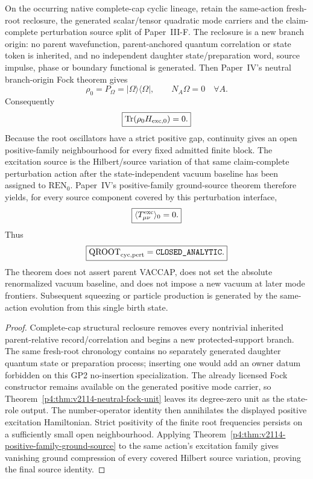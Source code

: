 \documentclass[12pt,a4paper]{article}
\begin{document}
\begin{theorem}
\label{p8:thm:v2114-fresh-root-neutral-qroot}
On the occurring native complete-cap cyclic lineage, retain the same-action
fresh-root reclosure, the generated scalar/tensor quadratic mode carriers and
the claim-complete perturbation source split of Paper~III-F.  The reclosure is
a new branch origin: no parent wavefunction, parent-anchored quantum
correlation or state token is inherited, and no independent daughter
state/preparation word, source impulse, phase or boundary functional is
generated.  Then Paper~IV's neutral branch-origin Fock theorem gives
\[
 \boxed{\rho_0=P_{\Omega}=|\Omega\rangle\langle\Omega|,
 \qquad N_A\Omega=0\quad\forall A.}
\]
Consequently
\[
 \boxed{\operatorname{Tr}(\rho_0H_{{\rm exc},0})=0.}
\]
Because the root oscillators have a strict positive gap, continuity gives an
open positive-family neighbourhood for every fixed admitted finite block.
The excitation source is the Hilbert/source variation of that same
claim-complete perturbation action after the state-independent vacuum
baseline has been assigned to \(\mathrm{REN}_0\).  Paper~IV's positive-family
ground-source theorem therefore yields, for every source component covered by
this perturbation interface,
\[
 \boxed{\langle T_{\mu\nu}^{\rm exc}\rangle_0=0.}
\]
Thus
\[
 \boxed{\mathrm{QROOT}_{\rm cyc,pert}
 =\texttt{CLOSED\_ANALYTIC}.}
\]
The theorem does not assert parent VACCAP, does not set the absolute
renormalized vacuum baseline, and does not impose a new vacuum at later mode
frontiers.  Subsequent squeezing or particle production is generated by the
same-action evolution from this single birth state.
\end{theorem}

\begin{proof}
Complete-cap structural reclosure removes every nontrivial inherited
parent-relative record/correlation and begins a new protected-support branch.
The same fresh-root chronology contains no separately generated daughter
quantum state or preparation process; inserting one would add an owner datum
forbidden on this GP2 no-insertion specialization.  The already licensed Fock
constructor remains available on the generated positive mode carrier, so
Theorem~\ref{p4:thm:v2114-neutral-fock-unit} leaves its degree-zero unit as the
state-role output.  The number-operator identity then annihilates the displayed
positive excitation Hamiltonian.  Strict positivity of the finite root
frequencies persists on a sufficiently small open neighbourhood.  Applying
Theorem~\ref{p4:thm:v2114-positive-family-ground-source} to the same action's
excitation family gives vanishing ground compression of every covered Hilbert
source variation, proving the final source identity.
\end{proof}
\end{document}

